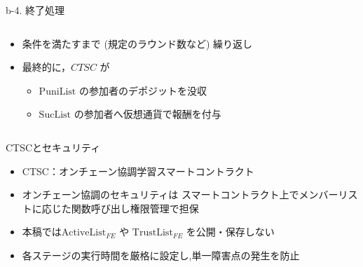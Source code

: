 \documentclass[unicode,12pt,aspectratio=169, dvipdfmx]{beamer}
\begin{document}
\begin{frame}{b-4. 終了処理}
    \begin{columns}
        \begin{column}[T]{.7\linewidth}
            \begin{itemize}
                \item 条件を満たすまで (規定のラウンド数など) 繰り返し
                \item 最終的に，$CTSC$ が
                  \begin{itemize}
                    \item $\mathrm{PuniList}$ の参加者のデポジットを没収
                    \item $\mathrm{SucList}$ の参加者へ仮想通貨で報酬を付与
                  \end{itemize}
            \end{itemize}
        \end{column}
    \end{columns}
\end{frame}



\begin{frame}{CTSCとセキュリティ}
    \begin{itemize}
      \item CTSC：オンチェーン協調学習スマートコントラクト
      \item オンチェーン協調のセキュリティは
        スマートコントラクト上でメンバーリストに応じた関数呼び出し権限管理で担保
      \item 本稿では\(\mathrm{ActiveList}_{FE}\) や \(\mathrm{TrustList}_{FE}\) を公開・保存しない
      \item 各ステージの実行時間を厳格に設定し,単一障害点の発生を防止
    \end{itemize}
  \end{frame}
  
\end{document}
